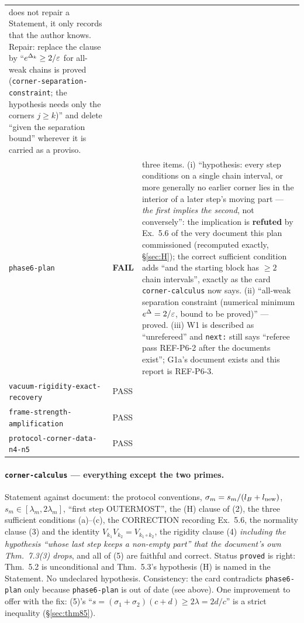 \documentclass[11pt]{article}
\theoremstyle{definition}\newtheorem{example}[theorem]{Example}
\begin{document}
\begin{center}
\begin{tabular}{@{}llp{8.6cm}@{}}
 does not repair a Statement, it only records that the author knows.  Repair: replace the
 clause by ``$e^{\Delta_k}\ge2/\varepsilon$ for all-weak chains is proved
 (\texttt{corner-separation-constraint}; the hypothesis needs only the corners $j\ge k$)''
 and delete ``given the separation bound'' wherever it is carried as a proviso.\\
\texttt{phase6-plan} & \textbf{FAIL} & three items.  (i) ``hypothesis: every step conditions
 on a single chain interval, or more generally no earlier corner lies in the interior of a
 later step's moving part --- \emph{the first implies the second}, not conversely'': the
 implication is \textbf{refuted} by Ex.~5.6 of the very document this plan commissioned
 (recomputed exactly, \S\ref{sec:H}); the correct sufficient condition adds ``and the
 starting block has $\ge2$ chain intervals'', exactly as the card
 \texttt{corner-calculus} now says.  (ii) ``all-weak separation constraint (numerical
 minimum $e^\Delta=2/\varepsilon$, bound to be proved)'' --- proved.  (iii) W1 is described as
 ``unrefereed'' and \texttt{next:} still says ``referee pass REF-P6-2 after the documents
 exist''; G1a's document exists and this report is REF-P6-3.\\
\texttt{vacuum-rigidity-exact-recovery} & PASS & \\
\texttt{frame-strength-amplification} & PASS & \\
\texttt{protocol-corner-data-n4-n5} & PASS & \\
\bottomrule
\end{tabular}
\end{center}

\paragraph{\texttt{corner-calculus} --- everything except the two primes.}
Statement against document: the protocol conventions, $\sigma_m=s_m/(l_B+l_{\rm new})$,
$s_m\in[\lambda_m,2\lambda_m]$, ``first step OUTERMOST'', the (H) clause of (2), the three
sufficient conditions (a)--(c), the CORRECTION recording Ex.~5.6, the normality clause (3)
and the identity $V_{k_1}V_{k_2}=V_{k_1\circ k_2}$, the rigidity clause (4)
\emph{including the hypothesis ``whose last step keeps a non-empty part'' that the document's
own Thm.~7.3(3) drops}, and all of (5) are faithful and correct.  Status \texttt{proved} is
right: Thm.~5.2 is unconditional and Thm.~5.3's hypothesis (H) is named in the Statement.
No undeclared hypothesis.  Consistency: the card contradicts \texttt{phase6-plan} only
because \texttt{phase6-plan} is out of date (see above).  One improvement to offer with the
fix: (5)'s ``$s=(\sigma_1+\sigma_2)(c+d)\ge2\lambda=2d/c$'' is a strict inequality
(\S\ref{sec:thm85}).
\end{document}
